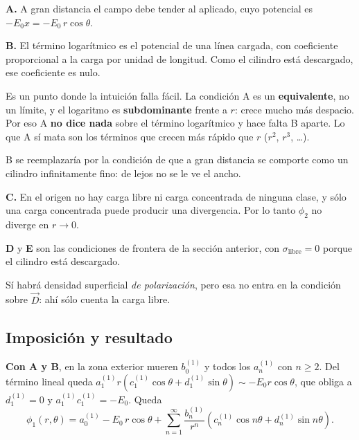 \documentclass[12pt,a4paper]{article}
\begin{document}
\textbf{A.} A gran distancia el campo debe tender al aplicado, cuyo potencial es
$-E_0 x = -E_0\, r\cos\theta$.

\textbf{B.} El término logarítmico es el potencial de una línea cargada, con
coeficiente proporcional a la carga por unidad de longitud. Como el cilindro está
descargado, ese coeficiente es nulo.

\begin{warnbox}
Es un punto donde la intuición falla fácil. La condición A es un
\textbf{equivalente}, no un límite, y el logaritmo es \textbf{subdominante}
frente a $r$: crece mucho más despacio. Por eso A \textbf{no dice nada} sobre el
término logarítmico y hace falta B aparte. Lo que A sí mata son los términos que
crecen más rápido que $r$ ($r^2$, $r^3$, \dots).
\end{warnbox}

\begin{notebox}
B se reemplazaría por la condición de que a gran distancia se comporte como un
cilindro infinitamente fino: de lejos no se le ve el ancho.
\end{notebox}

\textbf{C.} En el origen no hay carga libre ni carga concentrada de ninguna
clase, y sólo una carga concentrada puede producir una divergencia. Por lo tanto
$\phi_2$ no diverge en $r \to 0$.

\textbf{D} y \textbf{E} son las condiciones de frontera de la sección anterior,
con $\sigma_{\text{libre}}=0$ porque el cilindro está descargado.

\begin{notebox}
Sí habrá densidad superficial \emph{de polarización}, pero esa no entra en la
condición sobre $\vec D$: ahí sólo cuenta la carga libre.
\end{notebox}

\subsection{Imposición y resultado}

\textbf{Con A y B}, en la zona exterior mueren $b_0^{(1)}$ y todos los
$a_n^{(1)}$ con $n \ge 2$. Del término lineal queda
$a_1^{(1)} r \left(c_1^{(1)}\cos\theta + d_1^{(1)}\sin\theta\right)
\sim -E_0 r\cos\theta$, que obliga a $d_1^{(1)} = 0$ y
$a_1^{(1)} c_1^{(1)} = -E_0$. Queda
\[
\phi_1(r,\theta) = a_0^{(1)} - E_0\, r\cos\theta
+ \sum_{n=1}^{\infty} \frac{b_n^{(1)}}{r^{n}}
\left(c_n^{(1)} \cos n\theta + d_n^{(1)} \sin n\theta\right).
\]
\end{document}
